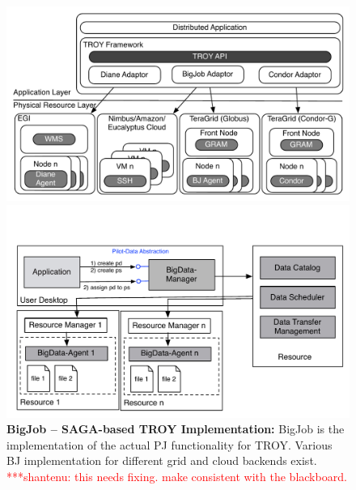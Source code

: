 \documentclass[conference,final]{IEEEtran}
\newcommand{\jhanote}[1]{ {\textcolor{red} { ***shantenu: #1 }}}
\newcommand{\alnote}[1]{ {\textcolor{blue} { ***andre: #1 }}}
\newcommand{\alnote}[1]{}
\newcommand{\jhanote}[1]{}
\newcommand{\up}{\vspace*{-1em}}
\begin{document}



\begin{figure}[t]
  \up\up\up
	\begin{minipage}[t]{0.475\linewidth}
	\centering
	\includegraphics[width=\textwidth]{figures/distributed_pilot_job.pdf}
	\caption{\textbf{BigJob -- SAGA-based TROY Implementation:}
          BigJob is the implementation of the actual PJ functionality
          for TROY. Various BJ implementation for different grid and
          cloud backends exist. \jhanote{this needs fixing. make
            consistent with the blackboard.}}
	\label{fig:figures_distributed_pilot_job}
	\end{minipage}
	\hspace{0.035\linewidth}
	\begin{minipage}[t]{0.475\linewidth}
	\centering
   	\includegraphics[width=\textwidth]{figures/pilot-data-manager.pdf}

\end{minipage}
\end{figure}
\end{document}
